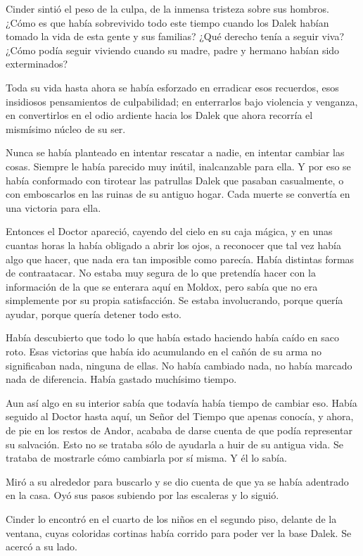 Cinder sintió el peso de la culpa, de la inmensa tristeza sobre sus hombros. ¿Cómo es que había sobrevivido todo este tiempo cuando los Dalek habían tomado la vida de esta gente y sus familias? ¿Qué derecho tenía a seguir viva? ¿Cómo podía seguir viviendo cuando su madre, padre y hermano habían sido exterminados?

Toda su vida hasta ahora se había esforzado en erradicar esos recuerdos, esos insidiosos pensamientos de culpabilidad; en enterrarlos bajo violencia y venganza, en convertirlos en el odio ardiente hacia los Dalek que ahora recorría el mismísimo núcleo de su ser.

Nunca se había planteado en intentar rescatar a nadie, en intentar cambiar las cosas. Siempre le había parecido muy inútil, inalcanzable para ella. Y por eso se había conformado con tirotear las patrullas Dalek que pasaban casualmente, o con emboscarlos en las ruinas de su antiguo hogar. Cada muerte se convertía en una victoria para ella.

Entonces el Doctor apareció, cayendo del cielo en su caja mágica, y en unas cuantas horas la había obligado a abrir los ojos, a reconocer que tal vez había algo que hacer, que nada era tan imposible como parecía. Había distintas formas de contraatacar. No estaba muy segura de lo que pretendía hacer con la información de la que se enterara aquí en Moldox, pero sabía que no era simplemente por su propia satisfacción. Se estaba involucrando, porque quería ayudar, porque quería detener todo esto.

Había descubierto que todo lo que había estado haciendo había caído en saco roto. Esas victorias que había ido acumulando en el cañón de su arma no significaban nada, ninguna de ellas. No había cambiado nada, no había marcado nada de diferencia. Había gastado muchísimo tiempo.

Aun así algo en su interior sabía que todavía había tiempo de cambiar eso. Había seguido al Doctor hasta aquí, un Señor del Tiempo que apenas conocía, y ahora, de pie en los restos de Andor, acababa de darse cuenta de que podía representar su salvación. Esto no se trataba sólo de ayudarla a huir de su antigua vida. Se trataba de mostrarle cómo cambiarla por sí misma. Y él lo sabía.

Miró a su alrededor para buscarlo y se dio cuenta de que ya se había adentrado en la casa. Oyó sus pasos subiendo por las escaleras y lo siguió.

Cinder lo encontró en el cuarto de los niños en el segundo piso, delante de la ventana, cuyas coloridas cortinas había corrido para poder ver la base Dalek. Se acercó a su lado.

